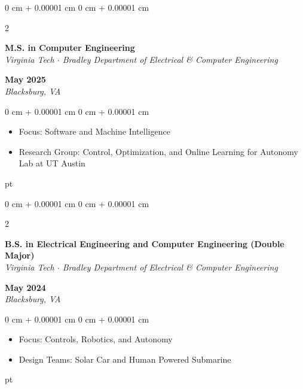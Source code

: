 \documentclass[10pt, letterpaper]{extarticle}
\newenvironment{highlights}{
    \begin{itemize}[
        topsep=0 pt,
        parsep=0 pt, 
        partopsep=0pt,
        itemsep=0pt,
        leftmargin=0.25 cm + 10pt
        ]
    }{
\end{itemize}
} %
\newenvironment{onecolentry}{
    \begin{adjustwidth}{
            0 cm + 0.00001 cm
        }{
            0 cm + 0.00001 cm
        }
    }{
    \end{adjustwidth}
} %
\newenvironment{twocolentry}[2][]{
    \onecolentry
    \def\secondColumn{#2}
    \setcolumnwidth{\fill, 4.5 cm}
    \begin{paracol}{2}
    }{
        \switchcolumn \raggedleft \secondColumn
    \end{paracol}
    \endonecolentry
} %
\let\hrefWithoutArrow\href
\begin{document}
\begin{twocolentry}{\textbf{May 2025}\\\textit{Blacksburg, VA}}
    \textbf{M.S. in Computer Engineering} \\
    \textit{Virginia Tech $\cdot$ Bradley Department of Electrical \& Computer Engineering}
\end{twocolentry}
\begin{onecolentry}
    \begin{highlights}
        \item Focus: Software and Machine Intelligence
        \item Research Group: Control, Optimization, and Online Learning for Autonomy Lab at UT Austin
    \end{highlights}
\end{onecolentry}
 pt%

\begin{twocolentry}{\textbf{May 2024}\\\textit{Blacksburg, VA}}
    \textbf{B.S. in Electrical Engineering and Computer Engineering (Double Major)} \\
    \textit{Virginia Tech $\cdot$ Bradley Department of Electrical \& Computer Engineering}
\end{twocolentry}
\begin{onecolentry}
    \begin{highlights}
        \item Focus: Controls, Robotics, and Autonomy
        \item Design Teams: Solar Car and Human Powered Submarine
    \end{highlights}
\end{onecolentry}
 pt%

\end{document}
